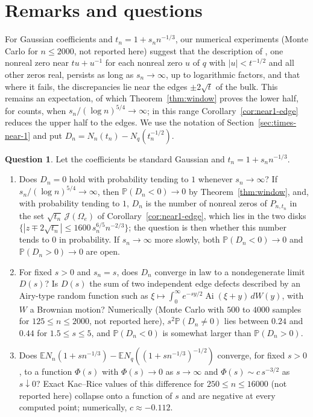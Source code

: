 \documentclass[11pt]{amsart}
\theoremstyle{definition}
\newtheorem{question}[theorem]{Question}
\theoremstyle{remark}
\numberwithin{equation}{section}
\newcommand{\E}{\mathbb{E}}
\newcommand{\PP}{\mathbb{P}}
\begin{document}
\section{Remarks and questions}\label{sec:questions}

For Gaussian coefficients and $t_n=1+s_nn^{-1/3}$, our numerical experiments (Monte Carlo for $n\le2000$, not reported here) suggest that the description of \cite[Theorem~\ref{M-thm:heat}]{Main}, one nonreal zero near $tu+u^{-1}$ for each nonreal zero $u$ of $q$ with $|u|<t^{-1/2}$ and all other zeros real, persists as long as $s_n\to\infty$, up to logarithmic factors, and that where it fails, the discrepancies lie near the edges $\pm2\sqrt t$ of the bulk. This remains an expectation, of which Theorem~\ref{thm:window} proves the lower half, for counts, when $s_n/(\log n)^{5/4}\to\infty$; in this range Corollary~\ref{cor:near1-edge} reduces the upper half to the edges. We use the notation of Section~\ref{sec:times-near-1} and put $D_n=N_n(t_n)-N_q(t_n^{-1/2})$.

\begin{question}\label{q:window}
Let the coefficients be standard Gaussian and $t_n=1+s_nn^{-1/3}$.
\begin{enumerate}
\item[(i)] Does $D_n=0$ hold with probability tending to $1$ whenever $s_n\to\infty$? If $s_n/(\log n)^{5/4}\to\infty$, then $\PP(D_n<0)\to0$ by Theorem~\ref{thm:window}, and, with probability tending to $1$, $D_n$ is the number of nonreal zeros of $P_{n,t_n}$ in the set $\sqrt{t_n}\,\mathcal J(\Omega_e)$ of Corollary~\ref{cor:near1-edge}, which lies in the two disks $\{|z\mp2\sqrt{t_n}|\le1600\,s_n^{6/5}n^{-2/3}\}$; the question is then whether this number tends to $0$ in probability. If $s_n\to\infty$ more slowly, both $\PP(D_n<0)\to0$ and $\PP(D_n>0)\to0$ are open.
\item[(ii)] For fixed $s>0$ and $s_n=s$, does $D_n$ converge in law to a nondegenerate limit $D(s)$? Is $D(s)$ the sum of two independent edge defects described by an Airy-type random function such as $\xi\mapsto\int_0^\infty e^{-sy/2}\operatorname{Ai}(\xi+y)\,dW(y)$, with $W$ a Brownian motion? Numerically (Monte Carlo with $500$ to $4000$ samples for $125\le n\le2000$, not reported here), $s^2\PP(D_n\ne0)$ lies between $0.24$ and $0.44$ for $1.5\le s\le5$, and $\PP(D_n<0)$ is somewhat larger than $\PP(D_n>0)$.
\item[(iii)] Does $\E N_n(1+sn^{-1/3})-\E N_q((1+sn^{-1/3})^{-1/2})$ converge, for fixed $s>0$, to a function $\Phi(s)$ with $\Phi(s)\to0$ as $s\to\infty$ and $\Phi(s)\sim c\,s^{-3/2}$ as $s\downarrow0$? Exact Kac--Rice values of this difference for $250\le n\le16000$ (not reported here) collapse onto a function of $s$ and are negative at every computed point; numerically, $c\approx-0.112$.
\end{enumerate}
\end{question}
\end{document}
